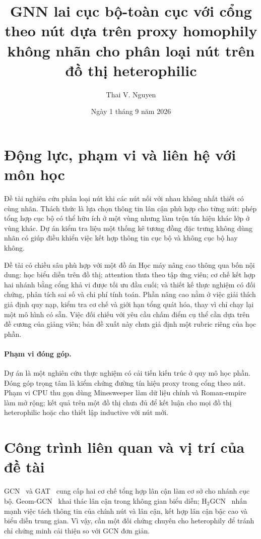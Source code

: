 \documentclass[12pt,a4paper]{article}
\title{\textbf{\Large GNN lai cục bộ-toàn cục với cổng theo nút dựa trên proxy homophily không nhãn cho phân loại nút trên đồ thị heterophilic}}
\author{Thai V. Nguyen}
\date{Ngày 1 tháng 9 năm 2026}
\numberwithin{equation}{section}
\theoremstyle{definition}
\begin{document}
\maketitle
\thispagestyle{plain}

\tableofcontents
\clearpage

\section{Động lực, phạm vi và liên hệ với môn học}
Đề tài nghiên cứu phân loại nút khi các nút nối với nhau không nhất thiết có cùng nhãn. Thách thức là lựa chọn thông tin lân cận phù hợp cho từng nút: phép tổng hợp cục bộ có thể hữu ích ở một vùng nhưng làm trộn tín hiệu khác lớp ở vùng khác. Dự án kiểm tra liệu một thống kê tương đồng đặc trưng không dùng nhãn có giúp điều khiển việc kết hợp thông tin cục bộ và không cục bộ hay không.

Đề tài có chiều sâu phù hợp với một đồ án Học máy nâng cao thông qua bốn nội dung: học biểu diễn trên đồ thị; attention thưa theo tập ứng viên; cơ chế kết hợp hai nhánh bằng cổng khả vi được tối ưu đầu cuối; và thiết kế thực nghiệm có đối chứng, phân tích sai số và chi phí tính toán. Phần nâng cao nằm ở việc giải thích giả định quy nạp, kiểm tra cơ chế và giới hạn tổng quát hóa, thay vì chỉ chạy lại một mô hình có sẵn. Việc đối chiếu với yêu cầu chấm điểm cụ thể cần dựa trên đề cương của giảng viên; bản đề xuất này chưa giả định một rubric riêng của học phần.

\paragraph{Phạm vi đóng góp.}
Dự án là một nghiên cứu thực nghiệm có cải tiến kiến trúc ở quy mô học phần. Đóng góp trọng tâm là kiểm chứng đường tín hiệu proxy trong cổng theo nút. Phạm vi CPU thu gọn dùng Minesweeper làm dữ liệu chính và Roman-empire làm mở rộng; kết quả trên một đồ thị chưa đủ để kết luận cho mọi đồ thị heterophilic hoặc cho thiết lập inductive với nút mới.

\section{Công trình liên quan và vị trí của đề tài}
GCN~\cite{kipf2017gcn} và GAT~\cite{velickovic2018gat} cung cấp hai cơ chế tổng hợp lân cận làm cơ sở cho nhánh cục bộ. Geom-GCN~\cite{pei2020geom} khai thác lân cận trong không gian biểu diễn; H$_2$GCN~\cite{zhu2020h2gcn} nhấn mạnh việc tách thông tin của chính nút và lân cận, kết hợp lân cận bậc cao và biểu diễn trung gian. Vì vậy, cần một đối chứng chuyên cho heterophily để tránh chỉ chứng minh cải thiện so với GCN đơn giản.
\end{document}
